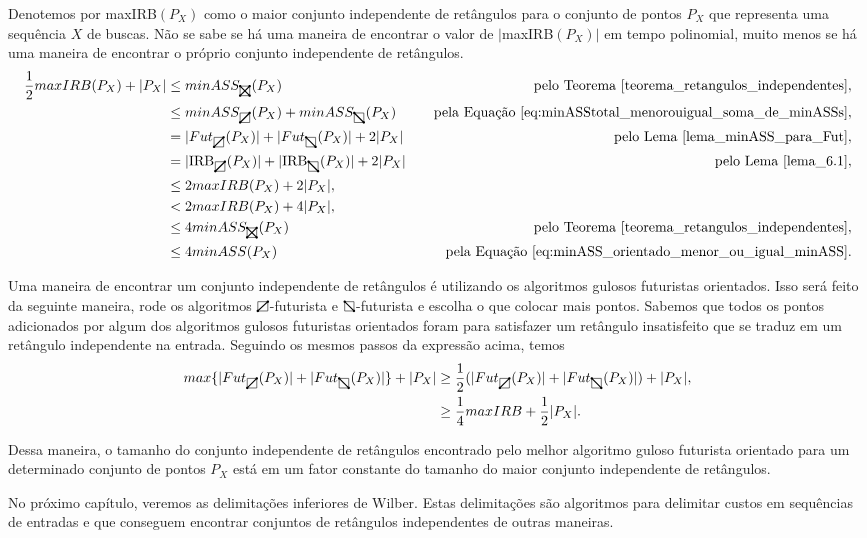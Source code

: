 Denotemos por maxIRB$(P_X)$ como o maior conjunto independente de retângulos para o conjunto de pontos $P_X$ que representa uma sequência $X$ de buscas. Não se sabe se há uma maneira de encontrar o valor de $|$maxIRB$(P_X)|$ em tempo polinomial, muito menos se há uma maneira de encontrar o próprio conjunto independente de retângulos.
\begin{align*}
    \frac{1}{2}maxIRB(P_X) + |P_X| &\leq minASS_{\recttotal}(P_X) \quad & \text{pelo Teorema~\ref{teorema_retangulos_independentes}},\\
    &\leq minASS_{\rectpos}(P_X) + minASS_{\rectneg}(P_X) \quad & \text{pela Equação~\ref{eq:minASStotal_menorouigual_soma_de_minASSs}},\\
    &= |Fut_{\rectpos}(P_X)| + |Fut_{\rectneg}(P_X)| + 2|P_X| \quad & \text{pelo Lema~\ref{lema_minASS_para_Fut}},\\
    &= |\text{IRB}_{\rectpos}(P_X)| + |\text{IRB}_{\rectneg}(P_X)| + 2|P_X| \quad & \text{pelo Lema~\ref{lema_6.1}},\\
    &\leq 2maxIRB(P_X) + 2|P_X|,\\
    &< 2maxIRB(P_X) + 4|P_X|,\\
    &\leq 4minASS_{\recttotal}(P_X) \quad & \text{pelo Teorema~\ref{teorema_retangulos_independentes}},\\
    &\leq 4minASS(P_X) \quad & \text{pela Equação~\ref{eq:minASS_orientado_menor_ou_igual_minASS}}.
\end{align*}

Uma maneira de encontrar um conjunto independente de retângulos é utilizando os algoritmos gulosos futuristas orientados. Isso será feito da seguinte maneira, rode os algoritmos $\rectpos$-futurista e $\rectneg$-futurista e escolha o que colocar mais pontos. Sabemos que todos os pontos adicionados por algum dos algoritmos gulosos futuristas orientados foram para satisfazer um retângulo insatisfeito que se traduz em um retângulo independente na entrada. Seguindo os mesmos passos da expressão acima, temos
\begin{align*}
    max\{|Fut_{\rectpos}(P_X)| + |Fut_{\rectneg}(P_X)|\} + |P_X| &\geq \frac{1}{2}(|Fut_{\rectpos}(P_X)| + |Fut_{\rectneg}(P_X)|) + |P_X|,\\
    &\geq \frac{1}{4}maxIRB + \frac{1}{2}|P_X|.
\end{align*}

Dessa maneira, o tamanho do conjunto independente de retângulos encontrado pelo melhor algoritmo guloso futurista orientado para um determinado conjunto de pontos $P_X$ está em um fator constante do tamanho do maior conjunto independente de retângulos.

No próximo capítulo, veremos as delimitações inferiores de Wilber. Estas delimitações são algoritmos para delimitar custos em sequências de entradas e que conseguem encontrar conjuntos de retângulos independentes de outras maneiras. 